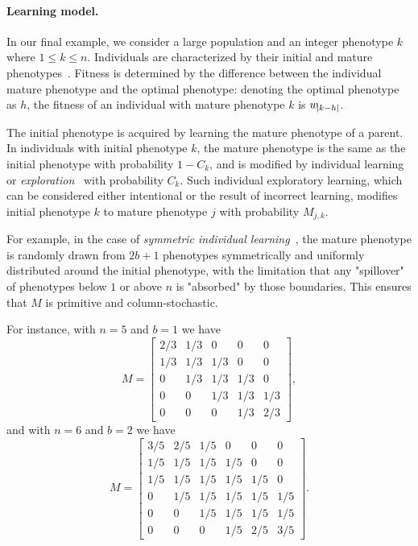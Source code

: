 \documentclass[9pt, a4paper, twocolumn]{extarticle}
\begin{document}
\paragraph*{Learning model.}\label{sec:learn_model}

In our final example, we consider a large population and an integer phenotype $k$ where $1 \le k \le n$.
Individuals are characterized by their initial and mature phenotypes~\citep[pg.~94]{Boyd1985}.
Fitness is determined by the difference between the individual mature phenotype and the optimal phenotype:
denoting the optimal phenotype as $h$, the fitness of an individual with mature phenotype $k$ is $w_{\abs{k-h}}$.

The initial phenotype is acquired by learning the mature phenotype of a parent.
In individuals with initial phenotype $k$, the mature phenotype is the same as the initial phenotype with probability $1-C_k$, and is modified by individual learning or \emph{exploration}~\citep{Borenstein2008} with probability $C_k$.
Such individual exploratory learning, which can be considered either intentional or the result of incorrect learning, modifies initial phenotype $k$ to mature phenotype $j$ with probability $M_{j,k}$.

For example, in the case of \emph{symmetric individual learning}~\citep{Borenstein2008}, the mature phenotype is randomly drawn from $2b+1$ phenotypes symmetrically and uniformly distributed around the initial phenotype, with the limitation that any "spillover" of phenotypes below $1$ or above $n$ is "absorbed" by those boundaries.
This ensures that $M$ is primitive and column-stochastic. 

For instance, with $n=5$ and $b=1$ we have
\begin{equation}
M = \begin{bmatrix}
2/3 & 1/3 & 0 & 0 & 0 \\
1/3 & 1/3 & 1/3 & 0 & 0 \\
0 & 1/3 & 1/3 & 1/3 & 0 \\
0 & 0 & 1/3 & 1/3 & 1/3 \\
0 & 0 & 0 & 1/3 & 2/3
\end{bmatrix},
\end{equation}
and with $n=6$ and $b=2$ we have
\begin{equation}
M = \begin{bmatrix}
3/5 & 2/5 & 1/5 & 0 & 0 & 0 \\
1/5 & 1/5 & 1/5 & 1/5 & 0 & 0 \\
1/5 & 1/5 & 1/5 & 1/5 & 1/5 & 0 \\
0 & 1/5 & 1/5 & 1/5 & 1/5 & 1/5 \\
0 & 0 & 1/5 & 1/5 & 1/5 & 1/5 \\
0 & 0 & 0 & 1/5 & 2/5 & 3/5
\end{bmatrix}.
\end{equation}
 
\end{document}
